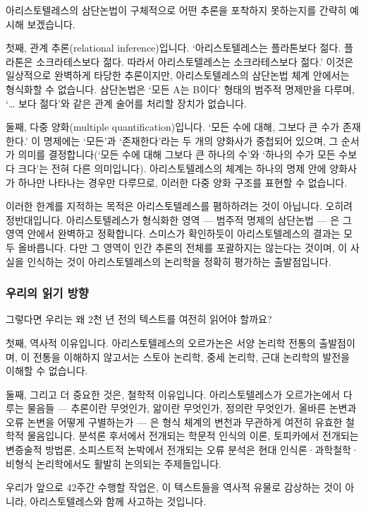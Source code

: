 \documentclass[12pt, a4paper]{article}
\begin{document}
아리스토텔레스의 삼단논법이 구체적으로 어떤 추론을 포착하지 못하는지를 간략히 예시해 보겠습니다.

첫째, 관계 추론(relational inference)입니다. `아리스토텔레스는 플라톤보다 젊다. 플라톤은 소크라테스보다 젊다. 따라서 아리스토텔레스는 소크라테스보다 젊다.' 이것은 일상적으로 완벽하게 타당한 추론이지만, 아리스토텔레스의 삼단논법 체계 안에서는 형식화할 수 없습니다. 삼단논법은 `모든 A는 B이다' 형태의 범주적 명제만을 다루며, `… 보다 젊다'와 같은 관계 술어를 처리할 장치가 없습니다.

둘째, 다중 양화(multiple quantification)입니다. `모든 수에 대해, 그보다 큰 수가 존재한다.' 이 명제에는 `모든'과 `존재한다'라는 두 개의 양화사가 중첩되어 있으며, 그 순서가 의미를 결정합니다(`모든 수에 대해 그보다 큰 하나의 수'와 `하나의 수가 모든 수보다 크다'는 전혀 다른 의미입니다). 아리스토텔레스의 체계는 하나의 명제 안에 양화사가 하나만 나타나는 경우만 다루므로, 이러한 다중 양화 구조를 표현할 수 없습니다.

이러한 한계를 지적하는 목적은 아리스토텔레스를 폄하하려는 것이 아닙니다. 오히려 정반대입니다. 아리스토텔레스가 형식화한 영역 --- 범주적 명제의 삼단논법 --- 은 그 영역 안에서 완벽하고 정확합니다. 스미스가 확인하듯이 아리스토텔레스의 결과는 모두 올바릅니다. 다만 그 영역이 인간 추론의 전체를 포괄하지는 않는다는 것이며, 이 사실을 인식하는 것이 아리스토텔레스의 논리학을 정확히 평가하는 출발점입니다.

\subsubsection{우리의 읽기 방향}

그렇다면 우리는 왜 2천 년 전의 텍스트를 여전히 읽어야 할까요?

첫째, 역사적 이유입니다. 아리스토텔레스의 오르가논은 서양 논리학 전통의 출발점이며, 이 전통을 이해하지 않고서는 스토아 논리학, 중세 논리학, 근대 논리학의 발전을 이해할 수 없습니다.

둘째, 그리고 더 중요한 것은, 철학적 이유입니다. 아리스토텔레스가 오르가논에서 다루는 물음들 --- 추론이란 무엇인가, 앎이란 무엇인가, 정의란 무엇인가, 올바른 논변과 오류 논변을 어떻게 구별하는가 --- 은 형식 체계의 변천과 무관하게 여전히 유효한 철학적 물음입니다. 분석론 후서에서 전개되는 학문적 인식의 이론, 토피카에서 전개되는 변증술적 방법론, 소피스트적 논박에서 전개되는 오류 분석은 현대 인식론·과학철학·비형식 논리학에서도 활발히 논의되는 주제들입니다.

우리가 앞으로 42주간 수행할 작업은, 이 텍스트들을 역사적 유물로 감상하는 것이 아니라, 아리스토텔레스와 함께 사고하는 것입니다.
\end{document}
